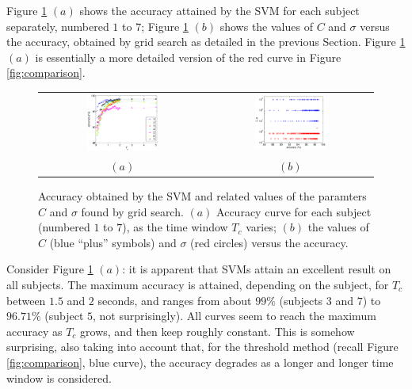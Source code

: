 \documentclass[a4paper,10pt,conference]{ieeeconf}
\begin{document}
Figure \ref{fig:accuracy} $(a)$ shows the accuracy attained by the SVM
for each subject separately, numbered $1$ to $7$; Figure
\ref{fig:accuracy} $(b)$ shows the values of $C$ and $\sigma$ versus
the accuracy, obtained by grid search as detailed in the previous
Section. Figure \ref{fig:accuracy} $(a)$ is essentially a more
detailed version of the red curve in Figure \ref{fig:comparison}.

\begin{figure}[!t]
  \begin{center}
    \begin{tabular}{cc}
      \includegraphics[width=0.45\textwidth]{accuracy.eps} &
      \includegraphics[width=0.45\textwidth]{hyperparams.eps} \\
      $(a)$ & $(b)$
    \end{tabular}
    \caption{Accuracy obtained by the SVM and related values of the
    paramters $C$ and $\sigma$ found by grid search. $(a)$ Accuracy
    curve for each subject (numbered $1$ to $7$), as the time window
    $T_c$ varies; $(b)$ the values of $C$ (blue ``plus'' symbols) and
    $\sigma$ (red circles) versus the accuracy.}
    \label{fig:accuracy}
  \end{center}
\end{figure}

Consider Figure \ref{fig:accuracy} $(a)$: it is apparent that SVMs
attain an excellent result on all subjects. The maximum accuracy is
attained, depending on the subject, for $T_c$ between $1.5$ and $2$
seconds, and ranges from about $99\%$ (subjects $3$ and $7$) to
$96.71\%$ (subject $5$, not surprisingly). All curves seem to reach
the maximum accuracy as $T_c$ grows, and then keep roughly
constant. This is somehow surprising, also taking into account that,
for the threshold method (recall Figure \ref{fig:comparison}, blue
curve), the accuracy degrades as a longer and longer time window is
considered.
\end{document}
